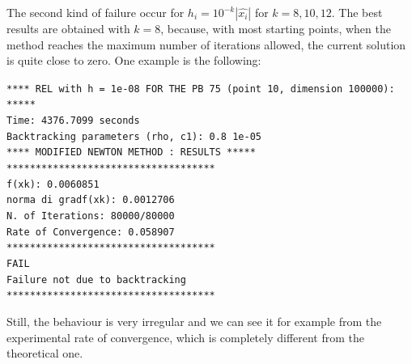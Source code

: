The second kind of failure occur for $h_i=10^{-k}|\hat{x_i}|$ for $k=8, 10, 12$. The best results are obtained with $k=8$, because, with most starting points, 
when the method reaches the maximum number of iterations allowed, the current solution is quite close to zero. One example is the following:
\begin{list}{}{\setlength{\leftmargin}{0.7cm}}
    \item \texttt{**** REL with h = 1e-08 FOR THE PB 75 (point 10, dimension 100000):  *****\\
    Time: 4376.7099 seconds\\
    Backtracking parameters (rho, c1): 0.8 1e-05\\
    **** MODIFIED NEWTON METHOD : RESULTS *****\\
    ************************************\\
    f(xk): 0.0060851\\
    norma di gradf(xk): 0.0012706\\
    N. of Iterations: 80000/80000\\
    Rate of Convergence: 0.058907\\
    ************************************\\
    FAIL\\
    Failure not due to backtracking\\
    ************************************\\
    }
\end{list}
Still, the behaviour is very irregular and we can see it for example from the experimental rate of convergence, which is completely
different from the theoretical one.

